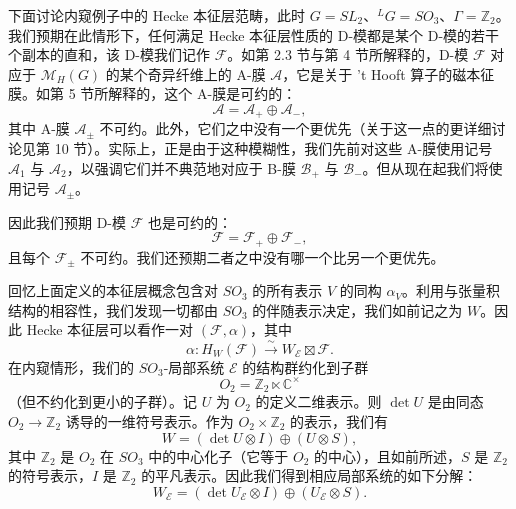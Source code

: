 \documentclass[11pt,a4paper]{article}
\begin{document}
下面讨论内窥例子中的 Hecke 本征层范畴，此时 $G = SL_2$、${}^LG = SO_3$、$\Gamma = \mathbb{Z}_2$。我们预期在此情形下，任何满足 Hecke 本征层性质的 D-模都是某个 D-模的若干个副本的直和，该 D-模我们记作 $\mathcal{F}$。如第 2.3 节与第 4 节所解释的，D-模 $\mathcal{F}$ 对应于 $\mathcal{M}_H(G)$ 的某个奇异纤维上的 A-膜 $\mathcal{A}$，它是关于 't Hooft 算子的磁本征膜。如第 5 节所解释的，这个 A-膜是可约的：
\[
\mathcal{A} = \mathcal{A}_+\oplus\mathcal{A}_-,
\]
其中 A-膜 $\mathcal{A}_\pm$ 不可约。此外，它们之中没有一个更优先（关于这一点的更详细讨论见第 10 节）。实际上，正是由于这种模糊性，我们先前对这些 A-膜使用记号 $\mathcal{A}_1$ 与 $\mathcal{A}_2$，以强调它们并不典范地对应于 B-膜 $\mathcal{B}_+$ 与 $\mathcal{B}_-$。但从现在起我们将使用记号 $\mathcal{A}_\pm$。

因此我们预期 D-模 $\mathcal{F}$ 也是可约的：
\[
\mathcal{F} = \mathcal{F}_+\oplus\mathcal{F}_-,
\]
且每个 $\mathcal{F}_\pm$ 不可约。我们还预期二者之中没有哪一个比另一个更优先。

回忆上面定义的本征层概念包含对 $SO_3$ 的所有表示 $V$ 的同构 $\alpha_V$。利用与张量积结构的相容性，我们发现一切都由 $SO_3$ 的伴随表示决定，我们如前记之为 $W$。因此 Hecke 本征层可以看作一对 $(\mathcal{F},\alpha)$，其中
\begin{equation}\tag{6.7}
\alpha : H_W(\mathcal{F})\xrightarrow{\sim} W_{\mathcal{E}}\boxtimes\mathcal{F}.
\end{equation}
在内窥情形，我们的 $SO_3$-局部系统 $\mathcal{E}$ 的结构群约化到子群
\[
O_2 = \mathbb{Z}_2\ltimes\mathbb{C}^\times
\]
（但不约化到更小的子群）。记 $U$ 为 $O_2$ 的定义二维表示。则 $\det U$ 是由同态 $O_2\to\mathbb{Z}_2$ 诱导的一维符号表示。作为 $O_2\times\mathbb{Z}_2$ 的表示，我们有
\[
W = (\det U\otimes I)\oplus(U\otimes S),
\]
其中 $\mathbb{Z}_2$ 是 $O_2$ 在 $SO_3$ 中的中心化子（它等于 $O_2$ 的中心），且如前所述，$S$ 是 $\mathbb{Z}_2$ 的符号表示，$I$ 是 $\mathbb{Z}_2$ 的平凡表示。因此我们得到相应局部系统的如下分解：
\begin{equation}\tag{6.8}
W_{\mathcal{E}} = (\det U_{\mathcal{E}}\otimes I)\oplus(U_{\mathcal{E}}\otimes S).
\end{equation}

\end{document}
